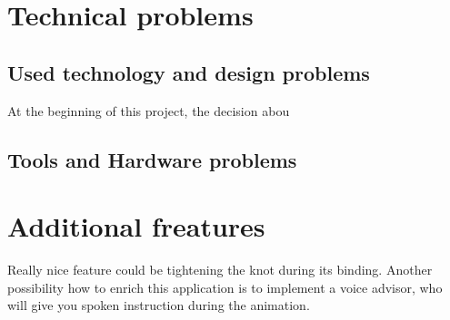 \section*{Technical problems} %
\label{sec:Technical problems}

\subsection*{Used technology and design problems} %
\label{sub:Used technology}
 At the beginning of this project, the decision abou

\subsection{Tools and Hardware problems} %
\label{sub:Hardware problems}


\section*{Additional freatures} %
\label{sec:Additional freatures}
 Really nice feature could be tightening the knot during its binding.
 Another possibility how to enrich this application is to implement
 a voice advisor, who will give you spoken instruction during the animation.


